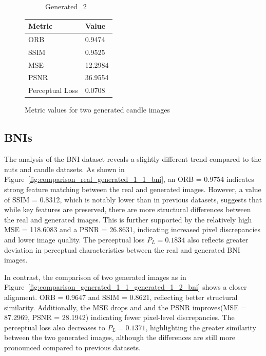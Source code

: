 \documentclass[12pt,DIV14,BCOR12mm,a4paper,footinclude=false,headinclude,parskip=half-,twoside,openright,cleardoublepage=empty,toc=index,bibliography=totoc,listof=totoc]{scrreprt}
\numberwithin{equation}{chapter}
\begin{document}
\begin{figure}
\begin{minipage}[H]{\linewidth}
\begin{minipage}[H]{0.5\linewidth}
\begin{subfigure}[t]{0.48\linewidth}
                \caption{Generated\_2}
            \end{subfigure}
        \end{minipage}%
        \hfill
        \begin{minipage}[H]{0.5\linewidth} %
            \centering
            \small
            \begin{tabular}{p{3cm} p{2cm}}
                \toprule
                \textbf{Metric} & \textbf{Value} \\
                \midrule
                ORB             & 0.9474        \\
                SSIM            & 0.9525        \\
                MSE             & 12.2984       \\
                PSNR            & 36.9554       \\
                Perceptual Loss & 0.0708        \\
                \bottomrule
            \end{tabular}
        \end{minipage}%
        \caption{Metric values for two generated candle images}
        \label{fig:comparison_generated_1_1_generated_1_2_candle}
    \end{minipage}
\end{figure}


\subsection{BNIs}

The analysis of the BNI dataset reveals a slightly different trend compared to the nuts and candle datasets. As shown in Figure~\ref{fig:comparison_real_generated_1_1_bni}, an ORB = 0.9754 indicates strong feature matching between the real and generated images. However, a value of SSIM = 0.8312, which is notably lower than in previous datasets, suggests that while key features are preserved, there are more structural differences between the real and generated images. This is further supported by the relatively high MSE = 118.6083 and a PSNR = 26.8631, indicating increased pixel discrepancies and lower image quality. The perceptual loss \( P_L = 0.1834 \) also reflects greater deviation in perceptual characteristics between the real and generated BNI images.

In contrast, the comparison of two generated images as in Figure~\ref{fig:comparison_generated_1_1_generated_1_2_bni} shows a closer alignment. ORB = 0.9647 and SSIM = 0.8621, reflecting better structural similarity. Additionally, the MSE drops and and the PSNR improves(MSE = 87.2969, PSNR = 28.1942) indicating fewer pixel-level discrepancies. The perceptual loss also decreases to \( P_L = 0.1371 \), highlighting the greater similarity between the two generated images, although the differences are still more pronounced compared to previous datasets.
\end{document}
